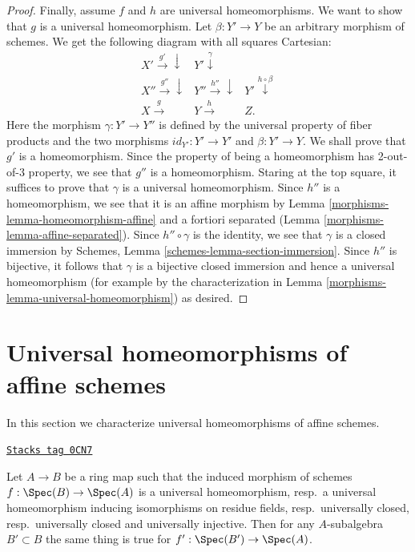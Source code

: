 \begin{proof}
\medskip\noindent
Finally, assume $f$ and $h$ are universal
homeomorphisms. We want to show that $g$ is a universal homeomorphism.
Let $\beta : Y' \to Y$ be an arbitrary morphism of schemes.
We get the following diagram with all squares Cartesian:
$$
\begin{array}{ccc}X' \overset{g'}{\longrightarrow}\downarrow & Y' \overset{\gamma}{\downarrow} &  \\ X'' \overset{g''}{\longrightarrow}\downarrow & Y'' \overset{h''}{\longrightarrow}\downarrow & Y' \overset{h \circ \beta}{\downarrow} \\ X \overset{g}{\longrightarrow} & Y \overset{h}{\longrightarrow} & Z.\end{array}
$$
Here the morphism $\gamma : Y' \to Y''$ is defined by the universal property of
fiber products and the two morphisms
$id_{Y'} : Y' \to Y'$ and $\beta : Y' \to Y$.
We shall prove that $g'$ is a homeomorphism.
Since the property of being a homeomorphism has 2-out-of-3 property, we see
that $g''$ is a homeomorphism.
Staring at the top square, it suffices to prove that $\gamma$ is a universal
homeomorphism. Since $h''$ is a homeomorphism, we see that it is
an affine morphism by Lemma \ref{morphisms-lemma-homeomorphism-affine}
and a fortiori separated (Lemma \ref{morphisms-lemma-affine-separated}).
Since $h'' \circ \gamma$ is the identity, we see that $\gamma$
is a closed immersion by
Schemes, Lemma \ref{schemes-lemma-section-immersion}.
Since $h''$ is bijective, it follows that $\gamma$ is a bijective
closed immersion and hence a universal homeomorphism (for example by the
characterization in Lemma \ref{morphisms-lemma-universal-homeomorphism}) as desired.
\end{proof}

\section{Universal homeomorphisms of affine schemes}
\label{morphisms-section-universal-homeomorphisms-affine}
In this section we characterize universal homeomorphisms of affine schemes.

\begin{lemma}
\label{morphisms-lemma-subalgebra-inherits}
\href{https://stacks.math.columbia.edu/tag/0CN7}{\texttt{Stacks tag 0CN7}}

Let $A \to B$ be a ring map such that the induced morphism of
schemes $f : \Spec(B) \to \Spec(A)$ is a universal homeomorphism,
resp.\ a universal homeomorphism inducing isomorphisms on residue fields,
resp.\ universally closed,
resp.\ universally closed and universally injective.
Then for any $A$-subalgebra $B' \subset B$
the same thing is true for $f' : \Spec(B') \to \Spec(A)$.
\end{lemma}


